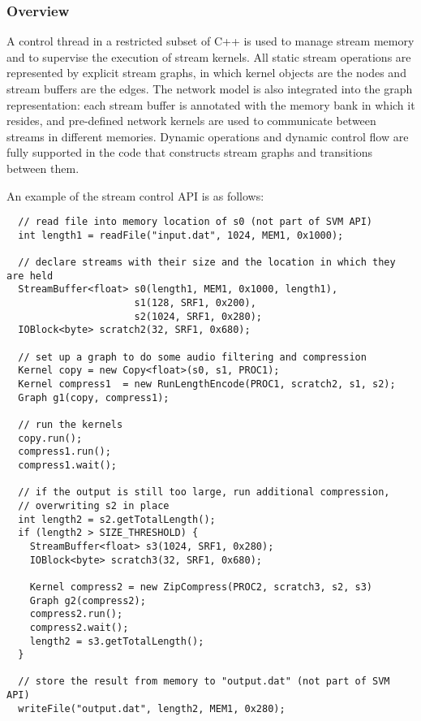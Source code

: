 \subsubsection{Overview}
\label{sec:streamover}

A control thread in a restricted subset of C++ is used to manage
stream memory and to supervise the execution of stream kernels.  All
static stream operations are represented by explicit stream graphs, in
which kernel objects are the nodes and stream buffers are the edges.
The network model is also integrated into the graph representation:
each stream buffer is annotated with the memory bank in which it
resides, and pre-defined network kernels are used to communicate
between streams in different memories.  Dynamic operations and dynamic
control flow are fully supported in the code that constructs stream
graphs and transitions between them.

An example of the stream control API is as follows:
{\small
\begin{verbatim}
  // read file into memory location of s0 (not part of SVM API)
  int length1 = readFile("input.dat", 1024, MEM1, 0x1000);

  // declare streams with their size and the location in which they are held
  StreamBuffer<float> s0(length1, MEM1, 0x1000, length1), 
                      s1(128, SRF1, 0x200), 
                      s2(1024, SRF1, 0x280);
  IOBlock<byte> scratch2(32, SRF1, 0x680);

  // set up a graph to do some audio filtering and compression
  Kernel copy = new Copy<float>(s0, s1, PROC1);
  Kernel compress1  = new RunLengthEncode(PROC1, scratch2, s1, s2);
  Graph g1(copy, compress1);

  // run the kernels
  copy.run();
  compress1.run();
  compress1.wait();

  // if the output is still too large, run additional compression, 
  // overwriting s2 in place
  int length2 = s2.getTotalLength();
  if (length2 > SIZE_THRESHOLD) {
    StreamBuffer<float> s3(1024, SRF1, 0x280);
    IOBlock<byte> scratch3(32, SRF1, 0x680);
    
    Kernel compress2 = new ZipCompress(PROC2, scratch3, s2, s3)
    Graph g2(compress2);
    compress2.run();
    compress2.wait();
    length2 = s3.getTotalLength();
  }

  // store the result from memory to "output.dat" (not part of SVM API)
  writeFile("output.dat", length2, MEM1, 0x280);
\end{verbatim}}

